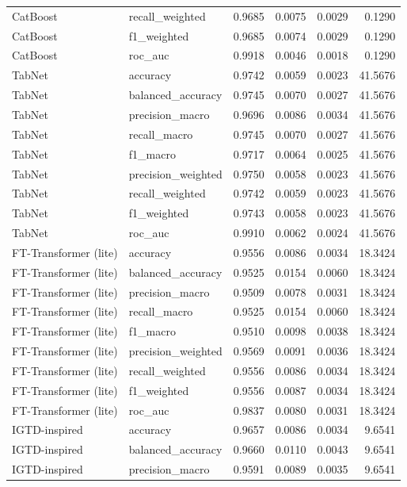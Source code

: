 \begin{tabular}{llrrrr}
CatBoost & recall_weighted & 0.9685 & 0.0075 & 0.0029 & 0.1290 \\
CatBoost & f1_weighted & 0.9685 & 0.0074 & 0.0029 & 0.1290 \\
CatBoost & roc_auc & 0.9918 & 0.0046 & 0.0018 & 0.1290 \\
TabNet & accuracy & 0.9742 & 0.0059 & 0.0023 & 41.5676 \\
TabNet & balanced_accuracy & 0.9745 & 0.0070 & 0.0027 & 41.5676 \\
TabNet & precision_macro & 0.9696 & 0.0086 & 0.0034 & 41.5676 \\
TabNet & recall_macro & 0.9745 & 0.0070 & 0.0027 & 41.5676 \\
TabNet & f1_macro & 0.9717 & 0.0064 & 0.0025 & 41.5676 \\
TabNet & precision_weighted & 0.9750 & 0.0058 & 0.0023 & 41.5676 \\
TabNet & recall_weighted & 0.9742 & 0.0059 & 0.0023 & 41.5676 \\
TabNet & f1_weighted & 0.9743 & 0.0058 & 0.0023 & 41.5676 \\
TabNet & roc_auc & 0.9910 & 0.0062 & 0.0024 & 41.5676 \\
FT-Transformer (lite) & accuracy & 0.9556 & 0.0086 & 0.0034 & 18.3424 \\
FT-Transformer (lite) & balanced_accuracy & 0.9525 & 0.0154 & 0.0060 & 18.3424 \\
FT-Transformer (lite) & precision_macro & 0.9509 & 0.0078 & 0.0031 & 18.3424 \\
FT-Transformer (lite) & recall_macro & 0.9525 & 0.0154 & 0.0060 & 18.3424 \\
FT-Transformer (lite) & f1_macro & 0.9510 & 0.0098 & 0.0038 & 18.3424 \\
FT-Transformer (lite) & precision_weighted & 0.9569 & 0.0091 & 0.0036 & 18.3424 \\
FT-Transformer (lite) & recall_weighted & 0.9556 & 0.0086 & 0.0034 & 18.3424 \\
FT-Transformer (lite) & f1_weighted & 0.9556 & 0.0087 & 0.0034 & 18.3424 \\
FT-Transformer (lite) & roc_auc & 0.9837 & 0.0080 & 0.0031 & 18.3424 \\
IGTD-inspired & accuracy & 0.9657 & 0.0086 & 0.0034 & 9.6541 \\
IGTD-inspired & balanced_accuracy & 0.9660 & 0.0110 & 0.0043 & 9.6541 \\
IGTD-inspired & precision_macro & 0.9591 & 0.0089 & 0.0035 & 9.6541 \\

\end{tabular}
